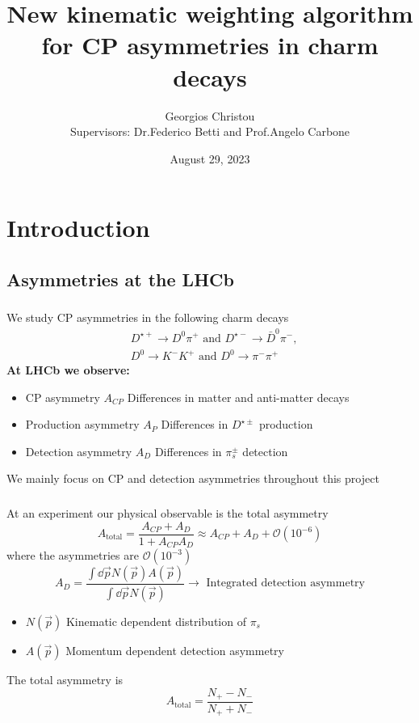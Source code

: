 \documentclass{beamer}
\title[\href{https://summerstudent.web.cern.ch/home}{CERN Summer Student Programme 2023}]
{     
      New kinematic weighting algorithm for CP asymmetries in charm decays
}
\author[\href{https://github.com/GiorgosChr}{Georgios Christou}]
{Georgios Christou
\\
Supervisors: Dr.\@ Federico Betti and Prof.\@ Angelo Carbone}
\institute[\href{https://lhcb.web.cern.ch/}{LHCb}]
{
      LHCb Collaboration
}
\date{August 29, 2023}
\begin{document}
\frame{\titlepage}
\begin{frame}
      \tableofcontents
\end{frame}

\section{Introduction}
\subsection{Asymmetries at the LHCb}

\begin{frame}
      \frametitle{\insertsubsectionhead}
      \rightarrow We study CP asymmetries in the following charm decays
      \begin{eqnarray*}
            &D^{\star+}\to D^0\pi^+ \text{ and } D^{\star-}\to \bar{D}^0\pi^-, \nonumber\\
            &D^0 \to K^-K^+ \text{ and } D^0 \to \pi^-\pi^+
    \end{eqnarray*}
      \textbf{At LHCb we observe:}
      \begin{itemize}
            \item CP asymmetry $A_{CP}$ \rightarrow Differences in matter and anti-matter decays
            \item Production asymmetry $A_{P}$ \rightarrow Differences in $D^{\star\pm}$ production
            \item Detection asymmetry $A_{D}$ \rightarrow Differences in $\pi_s^{\pm}$ detection
      \end{itemize}
      \bigbreak
      \rightarrow We mainly focus on CP and detection asymmetries throughout this project
\end{frame}

\begin{frame}
      \frametitle{\insertsubsectionhead}
      \rightarrow At an experiment our physical observable is the total asymmetry
      \begin{equation*}
            A_\text{total} = \frac{A_{CP} + A_{D}}{1 + A_{CP}A_D}\approx A_{CP} + A_{D} + \mathcal{O}(10^{-6})
      \end{equation*}
      where the asymmetries are $\mathcal{O}(10^{-3})$
      \begin{equation*}
            A_{D} = \frac{\int \dd \vec{p} N(\vec{p})A(\vec{p})}{\int \dd \vec{p} N(\vec{p})}\to \text{ Integrated detection asymmetry}
      \end{equation*}
      \begin{itemize}
            \item $N(\vec{p})$ \rightarrow Kinematic dependent distribution of $\pi_s$
            \item $A(\vec{p})$ \rightarrow Momentum dependent detection asymmetry
      \end{itemize}
      \rightarrow The total asymmetry is
      \begin{equation*}
            A_\text{total} = \frac{N_+ - N_-}{N_+ + N_-}
      \end{equation*}
\end{frame}
\end{document}
